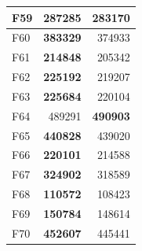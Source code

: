 \begin{table}[]
\begin{tabular}{l|r|r|}
\multicolumn{1}{|l|}{\cellcolor[HTML]{FCE6AB}F59}  & \cellcolor[HTML]{D3FFB6}\textbf{287285}                  & 283170                                                    \\ \hline
\multicolumn{1}{|l|}{\cellcolor[HTML]{FCE6AB}F60}  & \cellcolor[HTML]{D3FFB6}\textbf{383329}                  & 374933                                                    \\ \hline
\multicolumn{1}{|l|}{\cellcolor[HTML]{FCE6AB}F61}  & \cellcolor[HTML]{D3FFB6}\textbf{214848}                  & 205342                                                    \\ \hline
\multicolumn{1}{|l|}{\cellcolor[HTML]{FCE6AB}F62}  & \cellcolor[HTML]{D3FFB6}\textbf{225192}                  & 219207                                                    \\ \hline
\multicolumn{1}{|l|}{\cellcolor[HTML]{FCE6AB}F63}  & \cellcolor[HTML]{D3FFB6}\textbf{225684}                  & 220104                                                    \\ \hline
\multicolumn{1}{|l|}{\cellcolor[HTML]{FCE6AB}F64}  & 489291                                                   & \cellcolor[HTML]{D3FFB6}\textbf{490903}                   \\ \hline
\multicolumn{1}{|l|}{\cellcolor[HTML]{FCE6AB}F65}  & \cellcolor[HTML]{D3FFB6}\textbf{440828}                  & 439020                                                    \\ \hline
\multicolumn{1}{|l|}{\cellcolor[HTML]{FCE6AB}F66}  & \cellcolor[HTML]{D3FFB6}\textbf{220101}                  & 214588                                                    \\ \hline
\multicolumn{1}{|l|}{\cellcolor[HTML]{FCE6AB}F67}  & \cellcolor[HTML]{D3FFB6}\textbf{324902}                  & 318589                                                    \\ \hline
\multicolumn{1}{|l|}{\cellcolor[HTML]{FCE6AB}F68}  & \cellcolor[HTML]{D3FFB6}\textbf{110572}                  & 108423                                                    \\ \hline
\multicolumn{1}{|l|}{\cellcolor[HTML]{FCE6AB}F69}  & \cellcolor[HTML]{D3FFB6}\textbf{150784}                  & 148614                                                    \\ \hline
\multicolumn{1}{|l|}{\cellcolor[HTML]{FCE6AB}F70}  & \cellcolor[HTML]{D3FFB6}\textbf{452607}                  & 445441                                                    \\ \hline

\end{tabular}
\end{table}
